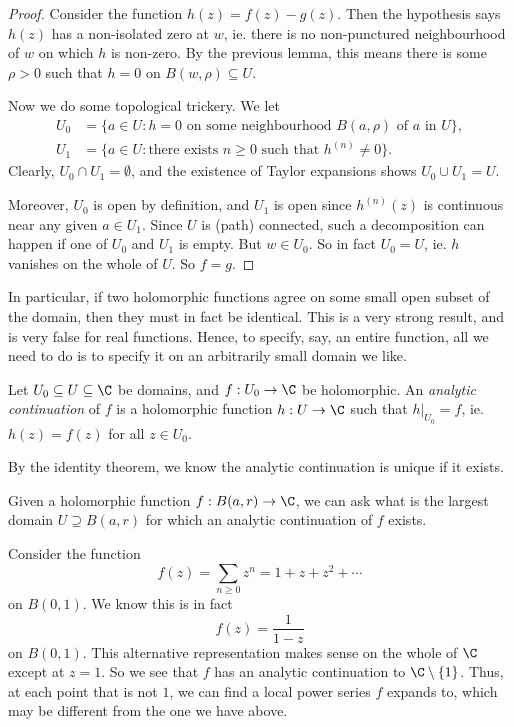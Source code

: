 \documentclass[a4paper]{article}
\begin{document}
\begin{proof}
  Consider the function $h(z) = f(z) - g(z)$. Then the hypothesis says $h(z)$ has a non-isolated zero at $w$, ie. there is no non-punctured neighbourhood of $w$ on which $h$ is non-zero. By the previous lemma, this means there is some $\rho > 0$ such that $h = 0$ on $B(w, \rho) \subseteq U$.

  Now we do some topological trickery. We let
  \begin{align*}
    U_0 &= \{a \in U: h = 0\text{ on some neighbourhood }B(a, \rho)\text{ of }a\text{ in }U\},\\
    U_1 &= \{a \in U: \text{there exists }n \geq 0\text{ such that }h^{(n)} \not= 0\}.
  \end{align*}
  Clearly, $U_0 \cap U_1 = \emptyset$, and the existence of Taylor expansions shows $U_0 \cup U_1 = U$.

  Moreover, $U_0$ is open by definition, and $U_1$ is open since $h^{(n)}(z)$ is continuous near any given $a \in U_1$. Since $U$ is (path) connected, such a decomposition can happen if one of $U_0$ and $U_1$ is empty. But $w \in U_0$. So in fact $U_0 = U$, ie. $h$ vanishes on the whole of $U$. So $f = g$.
\end{proof}

In particular, if two holomorphic functions agree on some small open subset of the domain, then they must in fact be identical. This is a very strong result, and is very false for real functions. Hence, to specify, say, an entire function, all we need to do is to specify it on an arbitrarily small domain we like.

\begin{defi}
  Let $U_0\subseteq U \subseteq \C$ be domains, and $f: U_0 \to \C$ be holomorphic. An \emph{analytic continuation} of $f$ is a holomorphic function $h:U \to \C$ such that $h|_{U_0} = f$, ie. $h(z) = f(z)$ for all $z \in U_0$.
\end{defi}
By the identity theorem, we know the analytic continuation is unique if it exists.

Given a holomorphic function $f: B(a, r) \to \C$, we can ask what is the largest domain $U \supseteq B(a, r)$ for which an analytic continuation of $f$ exists.

\begin{eg}
  Consider the function
  \[
    f(z) = \sum_{n \geq 0} z^n = 1 + z + z^2 + \cdots
  \]
  on $B(0, 1)$. We know this is in fact
  \[
    f(z) = \frac{1}{1 - z}
  \]
  on $B(0, 1)$. This alternative representation makes sense on the whole of $\C$ except at $z = 1$. So we see that $f$ has an analytic continuation to $\C \setminus \{1\}$. Thus, at each point that is not $1$, we can find a local power series $f$ expands to, which may be different from the one we have above.
\end{eg}
\end{document}
